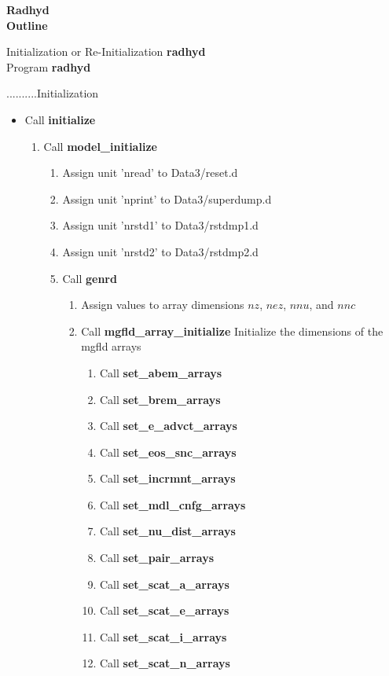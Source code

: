 \documentclass[11pt,doublespace]{article}
\begin{document}
\begin{center}
{\large {\bf Radhyd\\
Outline}}
\end{center}

\bigskip

{\Large Initialization or Re-Initialization {\bf radhyd}}\\

{\Large Program {\bf radhyd}}
\bigskip

\noindent..........{\Large Initialization}

\begin{itemize}
  \item Call {\bf initialize}
\begin{enumerate}
  \item Call {\bf model\_initialize}
\begin{enumerate}
  \item Assign unit 'nread' to Data3/reset.d
  \item Assign unit 'nprint' to Data3/superdump.d
  \item Assign unit 'nrstd1' to Data3/rstdmp1.d
  \item Assign unit 'nrstd2' to Data3/rstdmp2.d
  \item Call {\bf genrd}
\begin{enumerate}
  \item Assign values to array dimensions $nz$, $nez$, $nnu$, and $nnc$
  \item Call {\bf mgfld\_array\_initialize} Initialize the dimensions of the mgfld arrays
\begin{enumerate}
  \item Call {\bf set\_abem\_arrays}
  \item Call {\bf set\_brem\_arrays}
  \item Call {\bf set\_e\_advct\_arrays}
  \item Call {\bf set\_eos\_snc\_arrays}
  \item Call {\bf set\_incrmnt\_arrays}
  \item Call {\bf set\_mdl\_cnfg\_arrays}
  \item Call {\bf set\_nu\_dist\_arrays}
  \item Call {\bf set\_pair\_arrays}
  \item Call {\bf set\_scat\_a\_arrays}
  \item Call {\bf set\_scat\_e\_arrays}
  \item Call {\bf set\_scat\_i\_arrays}
  \item Call {\bf set\_scat\_n\_arrays}

\end{enumerate}
\end{enumerate}
\end{enumerate}
\end{enumerate}
\end{itemize}
\end{document}

